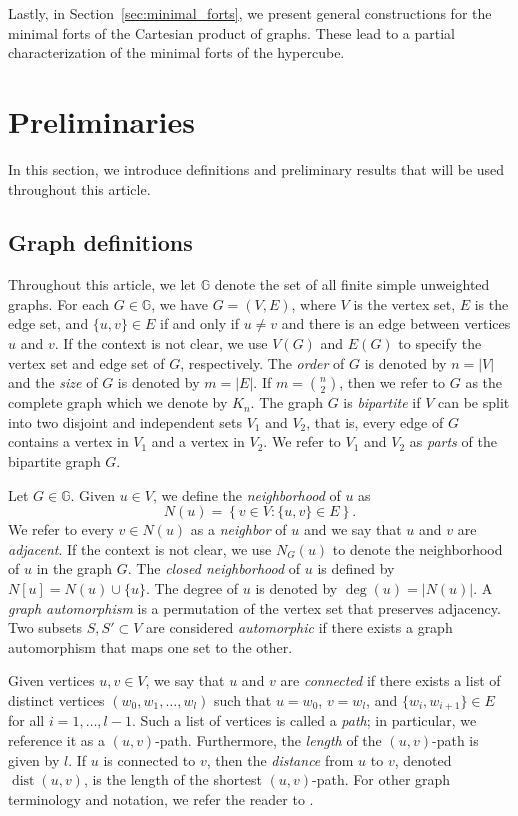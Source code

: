 \documentclass[twoside, 12pt]{article}
\theoremstyle{definition}
\newcommand\abs[1]{\left|#1\right|}
\renewcommand\deg[1]{\operatorname{deg}\left(#1\right)}
\newcommand\dist[2]{\operatorname{dist}\left(#1,#2\right)}
\begin{document}
Lastly, in Section~\ref{sec:minimal_forts}, we present general constructions for the minimal forts of the Cartesian product of graphs. These lead to a partial characterization of the minimal forts of the hypercube.
\section{Preliminaries}\label{sec:prelim}
In this section, we introduce definitions and preliminary results that will be used throughout this article.

\subsection{Graph definitions}
Throughout this article, we let $\mathbb{G}$ denote the set of all finite simple unweighted graphs.
For each $G\in\mathbb{G}$, we have $G=(V,E)$, where $V$ is the vertex set, $E$ is the edge set, and $\{u,v\}\in E$ if and only if $u\neq v$ and there is an edge between vertices $u$ and $v$.
If the context is not clear, we use $V(G)$ and $E(G)$ to specify the vertex set and edge set of $G$, respectively. 
The \emph{order} of $G$ is denoted by $n=\abs{V}$ and the \emph{size} of $G$ is denoted by $m=\abs{E}$.
If $m=\binom{n}{2}$, then we refer to $G$ as the complete graph which we denote by $K_{n}$.
The graph $G$ is \emph{bipartite} if $V$ can be split into two disjoint and independent sets $V_{1}$ and $V_{2}$, that is, every edge of $G$ contains a vertex in $V_{1}$ and a vertex in $V_{2}$.
We refer to $V_{1}$ and $V_{2}$ as \emph{parts} of the bipartite graph $G$. 

Let $G\in\mathbb{G}$.
Given $u\in V$, we define the \emph{neighborhood} of $u$ as 
\[
N(u) = \left\{v\in V\colon\{u,v\}\in E\right\}.
\]
We refer to every $v\in N(u)$ as a \emph{neighbor} of $u$ and we say that $u$ and $v$ are \emph{adjacent}. 
If the context is not clear, we use $N_{G}(u)$ to denote the neighborhood of $u$ in the graph $G$.
The \emph{closed neighborhood} of $u$ is defined by $N[u] = N(u)\cup\{u\}$. 
The degree of $u$ is denoted by $\deg{u}=\abs{N(u)}$.
A \emph{graph automorphism} is a permutation of the vertex set that preserves adjacency.
Two subsets $S,S'\subset V$ are considered \emph{automorphic} if there exists a graph automorphism that maps one set to the other.  

Given vertices $u,v\in V$, we say that $u$ and $v$ are \emph{connected} if there exists a list of distinct vertices $(w_{0},w_{1},\ldots,w_{l})$ such that $u=w_{0}$, $v=w_{l}$, and $\{w_{i},w_{i+1}\}\in E$ for all $i=1,\ldots,l-1$.
Such a list of vertices is called a \emph{path}; in particular, we reference it as a $(u,v)$-path. 
Furthermore, the \emph{length} of the $(u,v)$-path is given by $l$. 
If $u$ is connected to $v$, then the \emph{distance} from $u$ to $v$, denoted $\dist{u}{v}$, is the length of the shortest $(u,v)$-path. For other graph terminology and notation, we refer the reader to \cite{West2001}.
\end{document}
